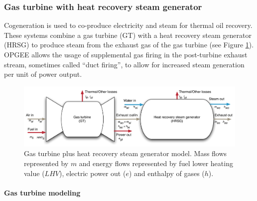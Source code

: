 \documentclass[11pt]{report}
\begin{document}
\subsubsection{Gas turbine with heat recovery steam generator}

Cogeneration is used to co-produce electricity and steam for thermal oil recovery. These systems combine a gas turbine (GT) with a heat recovery steam generator (HRSG) to produce steam from the exhaust gas of the gas turbine (see Figure \ref{fig:GT-HRSG}).  OPGEE allows the usage of supplemental gas firing in the post-turbine exhaust stream, sometimes called ``duct firing'', to allow for increased steam generation per unit of power output.

\begin{figure}[t]
\includegraphics[width=1\columnwidth]{images/GT+HRSG.pdf}
\caption{Gas turbine plus heat recovery steam generator model. Mass flows represented by $m$ and energy flows represented by fuel lower heating value ($LHV$), electric power out ($e$) and enthalpy of gases ($h$).}
\label{fig:GT-HRSG}
\end{figure}

\paragraph{Gas turbine modeling} 
\end{document}
